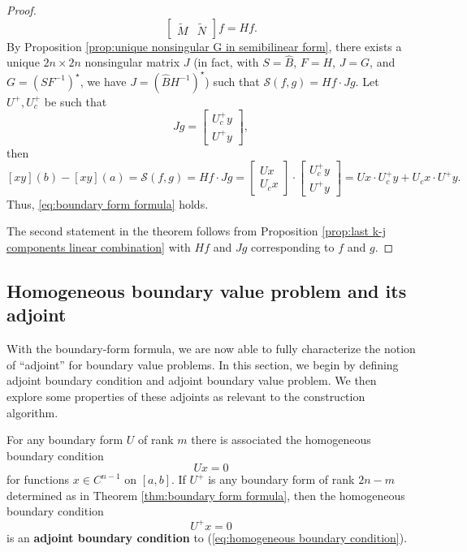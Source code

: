 \documentclass[11pt, oneside, a4paper]{article}
\begin{document}
\begin{proof}
\[\begin{bmatrix}
    \tilde{M} & \tilde{N}\end{bmatrix}f = Hf.\]
    By Proposition \ref{prop:unique nonsingular G in semibilinear form}, there exists a unique $2n\times 2n$ nonsingular matrix $J$ (in fact, with $S = \hat{B}$, $F=H$, $J=G$, and $G=(SF^{-1})^\star$, we have $J=(\hat{B}H^{-1})^\star$) such that $\mathcal{S}(f,g) = Hf\cdot Jg$. Let $U^+, U_c^+$ be such that
    \[Jg = \begin{bmatrix}U_c^+ y\\ U^+y\end{bmatrix},\]
    then 
    \[[xy](b)-[xy](a)=\mathcal{S}(f,g) = Hf\cdot Jg = \begin{bmatrix}Ux\\ U_cx\end{bmatrix}\cdot\begin{bmatrix}U_c^+ y \\ U^+y\end{bmatrix} = Ux\cdot U_c^+y + U_cx\cdot U^+y.\]
    Thus, \eqref{eq:boundary form formula} holds.

    The second statement in the theorem follows from Proposition \ref{prop:last k-j components linear combination} with $Hf$ and $Jg$ corresponding to $f$ and $g$.
\end{proof}

\subsection{Homogeneous boundary value problem and its adjoint}
With the boundary-form formula, we are now able to fully characterize the notion of ``adjoint'' for boundary value problems. In this section, we begin by defining adjoint boundary condition and adjoint boundary value problem. We then explore some properties of these adjoints as relevant to the construction algorithm.

\begin{defn}\cite[p.288-89]{CoddingtonLevinson}\label{defn:adjoint boundary condition}
    For any boundary form $U$ of rank $m$ there is associated the homogeneous boundary condition
    \begin{equation}\label{eq:homogeneous boundary condition}
        Ux=0
    \end{equation}
    for functions $x\in C^{n-1}$ on $[a,b]$. If $U^+$ is any boundary form of rank $2n-m$ determined as in Theorem \ref{thm:boundary form formula}, then the homogeneous boundary condition
    \begin{equation}\label{eq:adjoint boundary condition}
        U^+x=0
    \end{equation}
    is an \textbf{adjoint boundary condition} to (\ref{eq:homogeneous boundary condition}).
\end{defn}
\end{document}
